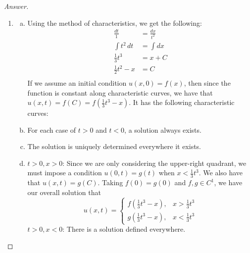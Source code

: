 \documentclass{article}
\theoremstyle{definition}
\renewcommand\qedsymbol{$\blacksquare$}
\newenvironment{ans}{\begin{proof}[Answer]\renewcommand{\qedsymbol}{}}{\end{proof}}
\begin{document}
\begin{ans}
\begin{enumerate}[(1), series=answers]
			\item \begin{enumerate}[a)]
                    \item Using the method of characteristics, we get the following:
                    \begin{align*}
                        \frac{dt}{1} &= \frac{dx}{t^2}\\
                        \int t^2\,dt &= \int dx\\
                        \frac{1}{3}t^3 &= x+C\\
                        \frac{1}{2}t^2 -x &= C\\
                    \end{align*}
                    If we assume an initial condition $u(x,0) = f(x)$, then since the function is constant along characteristic curves, we have that $\boxed{u(x,t) = f(C) = f\left(\frac{1}{3}t^3 - x\right)}$. It has the following characteristic curves:
                    
                    \begin{center}
                    \end{center}
                    
                    \item For each case of $t > 0$ and $t < 0$, a solution always exists.

                    \item The solution is uniquely determined everywhere it exists.

                    \item \underline{$t > 0, x > 0$}: Since we are only considering the upper-right quadrant, we must impose a condition $u(0,t) = g(t)$ when $x < \frac{1}{3}t^3$. We also have that $u(x,t) = g(C)$. Taking $f(0) = g(0)$ and $f,g\in C^1$, we have our overall solution that
                    \begin{equation*}
                    u(x,t) =
                    \begin{cases}
                        f\left(\frac{1}{3}t^3 - x\right), & x > \frac{1}{3}t^3\\
                        g\left(\frac{1}{3}t^3 - x\right), & x < \frac{1}{3}t^3
                    \end{cases}
                    \end{equation*}
                    \underline{$t > 0, x < 0$}: There is a solution defined everywhere.


\end{enumerate}
\end{enumerate}
\end{ans}
\end{document}
